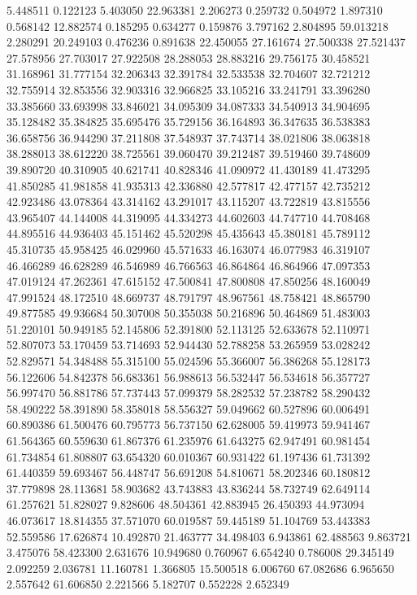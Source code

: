 5.448511
0.122123
5.403050
22.963381
2.206273
0.259732
0.504972
1.897310
0.568142
12.882574
0.185295
0.634277
0.159876
3.797162
2.804895
59.013218
2.280291
20.249103
0.476236
0.891638
22.450055
27.161674
27.500338
27.521437
27.578956
27.703017
27.922508
28.288053
28.883216
29.756175
30.458521
31.168961
31.777154
32.206343
32.391784
32.533538
32.704607
32.721212
32.755914
32.853556
32.903316
32.966825
33.105216
33.241791
33.396280
33.385660
33.693998
33.846021
34.095309
34.087333
34.540913
34.904695
35.128482
35.384825
35.695476
35.729156
36.164893
36.347635
36.538383
36.658756
36.944290
37.211808
37.548937
37.743714
38.021806
38.063818
38.288013
38.612220
38.725561
39.060470
39.212487
39.519460
39.748609
39.890720
40.310905
40.621741
40.828346
41.090972
41.430189
41.473295
41.850285
41.981858
41.935313
42.336880
42.577817
42.477157
42.735212
42.923486
43.078364
43.314162
43.291017
43.115207
43.722819
43.815556
43.965407
44.144008
44.319095
44.334273
44.602603
44.747710
44.708468
44.895516
44.936403
45.151462
45.520298
45.435643
45.380181
45.789112
45.310735
45.958425
46.029960
45.571633
46.163074
46.077983
46.319107
46.466289
46.628289
46.546989
46.766563
46.864864
46.864966
47.097353
47.019124
47.262361
47.615152
47.500841
47.800808
47.850256
48.160049
47.991524
48.172510
48.669737
48.791797
48.967561
48.758421
48.865790
49.877585
49.936684
50.307008
50.355038
50.216896
50.464869
51.483003
51.220101
50.949185
52.145806
52.391800
52.113125
52.633678
52.110971
52.807073
53.170459
53.714693
52.944430
52.788258
53.265959
53.028242
52.829571
54.348488
55.315100
55.024596
55.366007
56.386268
55.128173
56.122606
54.842378
56.683361
56.988613
56.532447
56.534618
56.357727
56.997470
56.881786
57.737443
57.099379
58.282532
57.238782
58.290432
58.490222
58.391890
58.358018
58.556327
59.049662
60.527896
60.006491
60.890386
61.500476
60.795773
56.737150
62.628005
59.419973
59.941467
61.564365
60.559630
61.867376
61.235976
61.643275
62.947491
60.981454
61.734854
61.808807
63.654320
60.010367
60.931422
61.197436
61.731392
61.440359
59.693467
56.448747
56.691208
54.810671
58.202346
60.180812
37.779898
28.113681
58.903682
43.743883
43.836244
58.732749
62.649114
61.257621
51.828027
9.828606
48.504361
42.883945
26.450393
44.973094
46.073617
18.814355
37.571070
60.019587
59.445189
51.104769
53.443383
52.559586
17.626874
10.492870
21.463777
34.498403
6.943861
62.488563
9.863721
3.475076
58.423300
2.631676
10.949680
0.760967
6.654240
0.786008
29.345149
2.092259
2.036781
11.160781
1.366805
15.500518
6.006760
67.082686
6.965650
2.557642
61.606850
2.221566
5.182707
0.552228
2.652349
